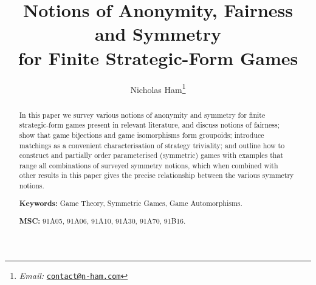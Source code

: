 \documentclass[a4paper, 11pt]{article}
\theoremstyle{paper}
\begin{document}
    \title{Notions of Anonymity, Fairness and Symmetry \\ for Finite Strategic-Form Games}
    \author{Nicholas Ham\footnote{{\it Email:} \href{mailto:contact@n-ham.com}{\tt contact@n-ham.com}}}
	\maketitle


    \begin{abstract}
    		In this paper we survey various notions of anonymity and symmetry for finite strategic-form games present in relevant literature, and discuss notions of fairness; show that game bijections and game isomorphisms form groupoids; introduce matchings as a convenient characterisation of strategy triviality; and outline how to construct and partially order parameterised (symmetric) games with examples that range all combinations of surveyed symmetry notions, which when combined with other results in this paper gives the precise relationship between the various symmetry notions.
    		
    		\textbf{Keywords:} Game Theory, Symmetric Games, Game Automorphisms.
    		
    		\textbf{MSC:} 
    		91A05, %
    		91A06, %
    		91A10, %
    		91A30, %
    		91A70, %
    		91B16. %
    \end{abstract}
    
    \tableofcontents
    
    
    
    
    
    
    
\end{document}
